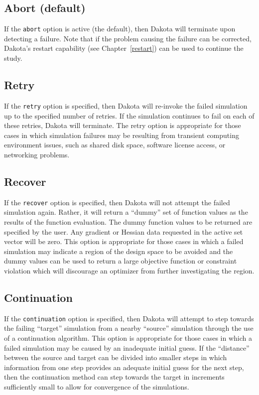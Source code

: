 \subsection{Abort (default)}\label{failure:mitigation:abort}

If the \texttt{abort} option is active (the default), then Dakota will
terminate upon detecting a failure. Note that if the problem causing
the failure can be corrected, Dakota's restart capability (see
Chapter~\ref{restart}) can be used to continue the study.

\subsection{Retry}\label{failure:mitigation:retry}

If the \texttt{retry} option is specified, then Dakota will re-invoke
the failed simulation up to the specified number of retries. If the
simulation continues to fail on each of these retries, Dakota will
terminate. The retry option is appropriate for those cases in which
simulation failures may be resulting from transient computing
environment issues, such as shared disk space, software license
access, or networking problems.

\subsection{Recover}\label{failure:mitigation:recover}

If the \texttt{recover} option is specified, then Dakota will not
attempt the failed simulation again. Rather, it will return a ``dummy''
set of function values as the results of the function evaluation. The
dummy function values to be returned are specified by the user. Any
gradient or Hessian data requested in the active set vector will be
zero. This option is appropriate for those cases in which a failed
simulation may indicate a region of the design space to be avoided and
the dummy values can be used to return a large objective function or 
constraint violation which will discourage an optimizer from further
investigating the region.

\subsection{Continuation}\label{failure:mitigation:continuation}

If the \texttt{continuation} option is specified, then Dakota will
attempt to step towards the failing ``target'' simulation from a nearby
``source'' simulation through the use of a continuation algorithm. This
option is appropriate for those cases in which a failed simulation may
be caused by an inadequate initial guess. If the ``distance'' between
the source and target can be divided into smaller steps in which
information from one step provides an adequate initial guess for the
next step, then the continuation method can step towards the target in
increments sufficiently small to allow for convergence of the
simulations.

